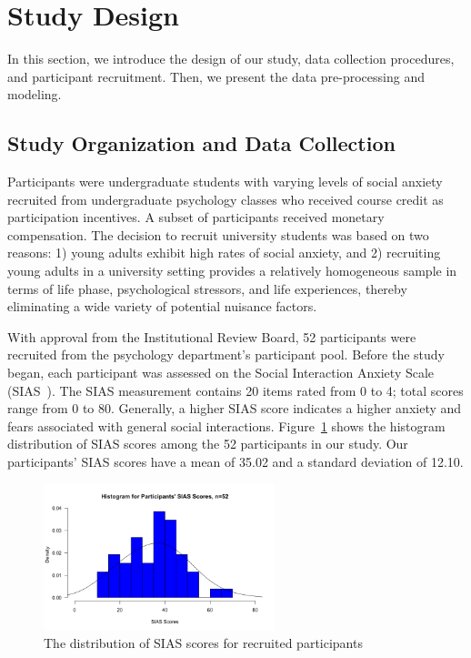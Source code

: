 

\section{Study Design}
\label{sec:study-design}

In this section, we introduce the design of our study, data collection procedures, and participant recruitment. Then, we present the data pre-processing and modeling.

\subsection{Study Organization and Data Collection}

Participants were undergraduate students with varying levels of social anxiety recruited from undergraduate psychology classes who received course credit as participation incentives.  A subset of participants received monetary compensation.  The decision to recruit university students was based on two reasons: 1) young adults exhibit high rates of social anxiety, and 2) recruiting young adults in a university setting provides a relatively homogeneous sample in terms of life phase, psychological stressors, and life experiences, thereby eliminating a wide variety of potential nuisance factors.

With approval from the Institutional Review Board, 52 participants were recruited from the psychology department's participant pool.  Before the study began, each participant was assessed on the Social Interaction Anxiety Scale (SIAS~\cite{Mattick1998}). The SIAS measurement contains 20 items rated from 0 to 4; total scores range from 0 to 80. Generally, a higher SIAS score indicates a higher anxiety and fears associated with general social interactions. Figure~\ref{fig:sias} shows the histogram distribution of SIAS scores among the 52 participants in our study. Our participants' SIAS scores have a mean of 35.02 and a standard deviation of 12.10. 

 \begin{figure}[htbp]
\centering
\includegraphics[width=0.6\textwidth]{./figures/sias_distri_52.png}
\caption{The distribution of SIAS scores for recruited participants}
 \label{fig:sias}
\end{figure}

